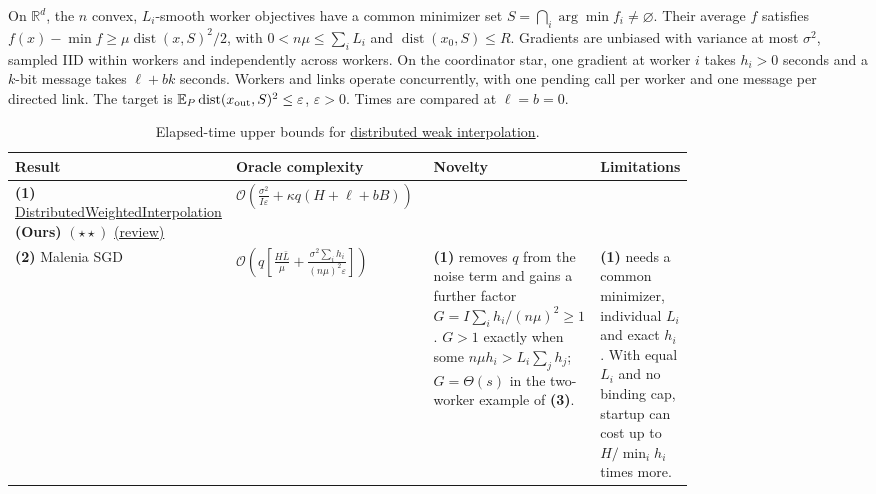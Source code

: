 \begin{table}[tp]
\centering
\caption{Elapsed-time upper bounds for \href{https://github.com/k3nfalt/longtails/blob/main/LongTails/Setups/DistributedWeakInterpolation.lean}{distributed weak interpolation}.}\label{tab:DistributedWeakInterpolation}
\parbox{\linewidth}{\footnotesize On $\mathbb R^d$, the $n$ convex, $L_i$-smooth worker objectives have a common minimizer set $S=\bigcap_i\arg\min f_i\ne\varnothing$. Their average $f$ satisfies $f(x)-\min f\ge\mu\operatorname{dist}(x,S)^2/2$, with $0<n\mu\le\sum_i L_i$ and $\operatorname{dist}(x_0,S)\le R$. Gradients are unbiased with variance at most $\sigma^2$, sampled IID within workers and independently across workers. On the coordinator star, one gradient at worker $i$ takes $h_i>0$ seconds and a $k$-bit message takes $\ell+bk$ seconds. Workers and links operate concurrently, with one pending call per worker and one message per directed link. The target is $\mathbb E_P\operatorname{dist}(x_{\rm out},S)^2\le\varepsilon$, $\varepsilon>0$. Times are compared at $\ell=b=0$.}\par\smallskip
\begin{threeparttable}
\footnotesize
\setlength{\tabcolsep}{4pt}\renewcommand{\arraystretch}{1.25}
\begin{tabularx}{\linewidth}{@{}>{\raggedright\arraybackslash}p{0.17\linewidth}>{\raggedright\arraybackslash}p{0.36\linewidth}>{\raggedright\arraybackslash}p{0.26\linewidth}>{\raggedright\arraybackslash}X@{}}
\toprule
\textbf{Result} & \textbf{Oracle complexity} & \textbf{Novelty} & \textbf{Limitations} \\
\midrule
\textbf{(1)} \href{https://github.com/k3nfalt/longtails/blob/main/LongTails/Theorems/DistributedWeightedInterpolation.lean}{Distributed\allowbreak Weighted\allowbreak Interpolation} \textbf{(Ours)} $(\star\star)$ \href{https://github.com/k3nfalt/longtails/blob/main/scripts/reviews/DistributedWeightedInterpolation.md}{(review)}
& $\mathcal{O}\!\left(\frac{\sigma^2}{I\varepsilon}+\kappa q(H+\ell+bB)\right)$ & & \\
\midrule[1.2pt]
\textbf{(2)} Malenia SGD \citep[Thm.~F.2]{dwiTyurin2026v1}
& $\mathcal{O}\!\left(q\left[\frac{H\bar L}{\mu}+\frac{\sigma^2\sum_i h_i}{(n\mu)^2\varepsilon}\right]\right)$
& \textbf{(1)} removes $q$ from the noise term and gains a further factor $G=I\sum_i h_i/(n\mu)^2\ge1$. $G>1$ exactly when some $n\mu h_i>L_i\sum_jh_j$; $G=\Theta(s)$ in the two-worker example of \textbf{(3)}.
& \textbf{(1)} needs a common minimizer, individual $L_i$ and exact $h_i$. With equal $L_i$ and no binding cap, startup can cost up to $H/\min_i h_i$ times more. \\

\end{tabularx}
\end{threeparttable}
\end{table}
